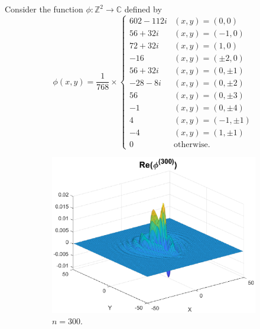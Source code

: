 \documentclass[11pt, letter]{book}
\newenvironment{example}
  {\pushQED{\qed}\renewcommand{\qedsymbol}{$\triangle$}\examplex}
  {\popQED\endexamplex}
\newcommand{\f}[2]{\frac{#1}{#2}}
\begin{document}
\begin{example}\label{exp:firstExample}\normalfont
Consider the function $\phi : \mathbb{Z}^2 \to \mathbb{C}$ defined by 
\begin{equation*}
    \phi(x,y) = 
    \f{1}{768}\times
    \begin{cases}
    602 - 112i &(x,y) = (0,0)\\
    56 + 32i   &(x,y) = (-1,0)\\
    72 + 32i   &(x,y) = (1,0)\\
    -16        &(x,y) = (\pm 2,0)\\
    56 + 32i   &(x,y) = (0,\pm 1)\\
    -28 - 8i   &(x,y) = (0,\pm 2)\\
    56         &(x,y) = (0,\pm 3)\\
    -1         &(x,y) = (0,\pm 4)\\
    4          &(x,y) = (-1,\pm 1)\\
    -4         &(x,y) = (1,\pm 1)\\
    0          &\text{otherwise}.
    \end{cases}
\end{equation*}
\begin{figure}[!htb]
    \begin{subfigure}{0.49\textwidth}
    \centering
    \includegraphics[scale=0.54]{conv_ex0.eps}
    \caption{$n = 300$.}
    \end{subfigure}
    \begin{subfigure}{0.49\textwidth}
    \centering

\end{subfigure}
\end{figure}
\end{example}
\end{document}
